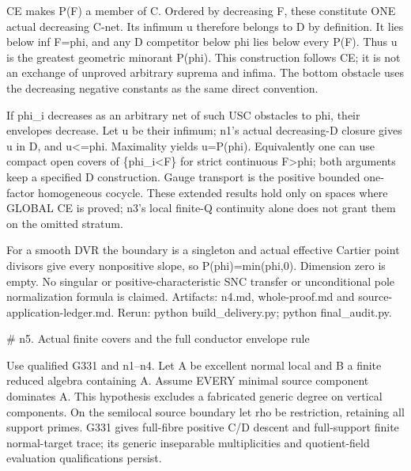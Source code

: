 \documentclass[11pt]{article}
\begin{document}
CE makes P(F) a member of C. Ordered by decreasing F, these constitute ONE actual decreasing C-net. Its infimum u therefore belongs to D by definition. It lies below inf F=phi, and any D competitor below phi lies below every P(F). Thus u is the greatest geometric minorant P(phi). This construction follows CE; it is not an exchange of unproved arbitrary suprema and infima. The bottom obstacle uses the decreasing negative constants as the same direct convention.

If phi\_i decreases as an arbitrary net of such USC obstacles to phi, their envelopes decrease. Let u be their infimum; n1's actual decreasing-D closure gives u in D, and u<=phi. Maximality yields u=P(phi). Equivalently one can use compact open covers of \{phi\_i<F\} for strict continuous F>phi; both arguments keep a specified D construction. Gauge transport is the positive bounded one-factor homogeneous cocycle. These extended results hold only on spaces where GLOBAL CE is proved; n3's local finite-Q continuity alone does not grant them on the omitted stratum.

For a smooth DVR the boundary is a singleton and actual effective Cartier point divisors give every nonpositive slope, so P(phi)=min(phi,0). Dimension zero is empty. No singular or positive-characteristic SNC transfer or unconditional pole normalization formula is claimed. Artifacts: n4.md, whole-proof.md and source-application-ledger.md. Rerun: python build\_delivery.py; python final\_audit.py.

 \# n5. Actual finite covers and the full conductor envelope rule

Use qualified G331 and n1--n4. Let A be excellent normal local and B a finite reduced algebra containing A. Assume EVERY minimal source component dominates A. This hypothesis excludes a fabricated generic degree on vertical components. On the semilocal source boundary let rho be restriction, retaining all support primes. G331 gives full-fibre positive C/D descent and full-support finite normal-target trace; its generic inseparable multiplicities and quotient-field evaluation qualifications persist.
\end{document}
